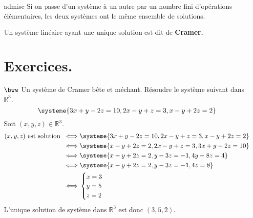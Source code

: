 \documentclass[11pt]{article}
\begin{document}
\begin{prop}{admise}{}
    Si on passe d'un système à un autre par un nombre fini d'opérations élémentaires, les deux systèmes ont le même ensemble de solutions.
\end{prop}

\begin{defi}{}{}
    Un système linéaire ayant une unique solution est dit de \bf{Cramer}.
\end{defi}

\pagebreak

\section{Exercices.}

\begin{exercice}{$\bww$ Un système de Cramer bête et méchant.}{}
    Résoudre le système suivant dans $\mathbb{R}^3$.
    \begin{equation*}
        \systeme{
            3x + y- 2z = 10,
            2x - y+ z = 3,
            x - y +2z = 2
        }
    \end{equation*}
    \tcblower
    Soit $(x,y,z)\in\mathbb{R}^3$.
    \begin{align*}
        (x,y,z) \text{ est solution }
        \iff&
        \systeme{
            3x + y -2z = 10,
            2x - y + z = 3,
            x - y + 2z = 2
        }\\ \iff&
        \systeme{
            x - y + 2z = 2,
            2x - y + z = 3,
            3x + y - 2z = 10
        }\\ \iff&
        \systeme{
            x-y+2z=2,
            y-3z=-1,
            4y-8z=4
        }\\ \iff&
        \systeme{
            x-y+2z=2,
            y-3z=-1,
            4z=8
        }\\ \iff&
        \begin{cases}
            x=3\\
            y=5\\
            z=2
        \end{cases}
    \end{align*}
    L'unique solution de système dans $\mathbb{R}^3$ est donc $(3,5,2)$.
\end{exercice}
\end{document}
